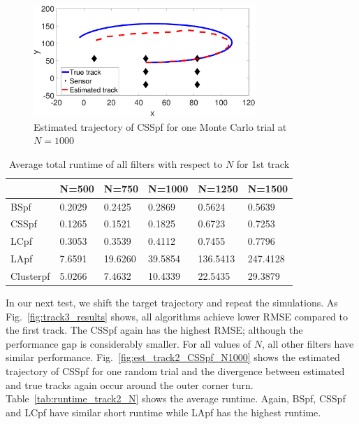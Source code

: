 \documentclass[10pt,letterpaper,final]{article}
\begin{document}
\begin{figure}
\centering
\includegraphics[width=0.75\textwidth]{Figures/est_track_CSSpf_N1000.pdf}
\caption{Estimated trajectory of CSSpf for one Monte Carlo trial at $N=1000$}
\label{fig:est_track_CSSpf_N1000}
\end{figure}

\begin{table}[]
\centering
\begin{tabular}{|l|l|l|l|l|l|}
\hline
          & N=500  & N=750   & N=1000  & N=1250   & N=1500   \\ \hline
BSpf      & 0.2029 & 0.2425  & 0.2869  & 0.5624   & 0.5639   \\ \hline
CSSpf     & 0.1265 & 0.1521  & 0.1825  & 0.6723   & 0.7253   \\ \hline
LCpf      & 0.3053 & 0.3539  & 0.4112  & 0.7455   & 0.7796   \\ \hline
LApf      & 7.6591 & 19.6260 & 39.5854 & 136.5413 & 247.4128 \\ \hline
Clusterpf & 5.0266 & 7.4632  & 10.4339 & 22.5435  & 29.3879  \\ \hline
\end{tabular}
\caption{Average total runtime of all filters with respect to $N$ for 1st track}
\label{tab:runtime_track1_N}
\end{table}

In our next test, we shift the target trajectory and repeat the simulations. As Fig.~\ref{fig:track3_results} shows, all algorithms achieve lower RMSE compared to the first track. The CSSpf again has the highest RMSE; although the performance gap is considerably smaller. For all values of $N$, all other filters have similar performance. Fig.~\ref{fig:est_track2_CSSpf_N1000} shows the estimated trajectory of CSSpf for one random trial and the divergence between estimated and true tracks again occur around the outer corner turn. Table~\ref{tab:runtime_track2_N} shows the average runtime. Again, BSpf, CSSpf and LCpf have similar short runtime while LApf has the highest runtime. 
\end{document}
